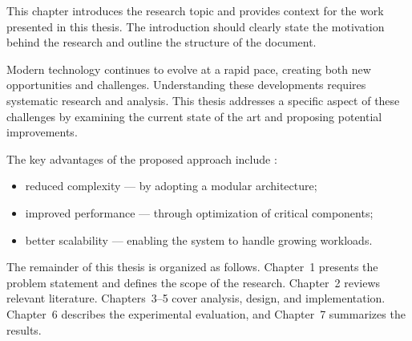 
This chapter introduces the research topic and provides context for the work presented in this thesis.
The introduction should clearly state the motivation behind the research and outline the structure of the document.

Modern technology continues to evolve at a rapid pace, creating both new opportunities and challenges.
Understanding these developments requires systematic research and analysis.
This thesis addresses a specific aspect of these challenges by examining the current state of the art and proposing potential improvements.

The key advantages of the proposed approach include \cite{sample-ref}:
\begin{itemize}
    \item reduced complexity --- by adopting a modular architecture;
    \item improved performance --- through optimization of critical components;
    \item better scalability --- enabling the system to handle growing workloads.
\end{itemize}

The remainder of this thesis is organized as follows.
Chapter~1 presents the problem statement and defines the scope of the research.
Chapter~2 reviews relevant literature.
Chapters~3--5 cover analysis, design, and implementation.
Chapter~6 describes the experimental evaluation, and Chapter~7 summarizes the results.

\clearpage
